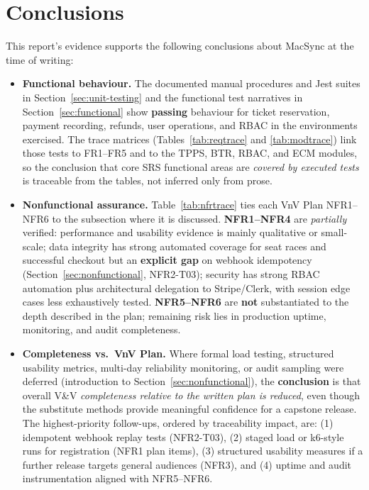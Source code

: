 \documentclass[12pt, titlepage]{article}
\begin{document}
\section{Conclusions}

This report's evidence supports the following conclusions about MacSync at the time of writing:

\begin{itemize}
\item \textbf{Functional behaviour.} The documented manual procedures and Jest suites in Section~\ref{sec:unit-testing} and the functional test narratives in Section~\ref{sec:functional} show \textbf{passing} behaviour for ticket reservation, payment recording, refunds, user operations, and RBAC in the environments exercised. The trace matrices (Tables~\ref{tab:reqtrace} and \ref{tab:modtrace}) link those tests to FR1--FR5 and to the TPPS, BTR, RBAC, and ECM modules, so the conclusion that core SRS functional areas are \emph{covered by executed tests} is traceable from the tables, not inferred only from prose.

\item \textbf{Nonfunctional assurance.} Table~\ref{tab:nfrtrace} ties each VnV Plan NFR1--NFR6 to the subsection where it is discussed. \textbf{NFR1--NFR4} are \emph{partially} verified: performance and usability evidence is mainly qualitative or small-scale; data integrity has strong automated coverage for seat races and successful checkout but an \textbf{explicit gap} on webhook idempotency (Section~\ref{sec:nonfunctional}, NFR2-T03); security has strong RBAC automation plus architectural delegation to Stripe/Clerk, with session edge cases less exhaustively tested. \textbf{NFR5--NFR6} are \textbf{not} substantiated to the depth described in the plan; remaining risk lies in production uptime, monitoring, and audit completeness.

\item \textbf{Completeness vs.\ VnV Plan.} Where formal load testing, structured usability metrics, multi-day reliability monitoring, or audit sampling were deferred (introduction to Section~\ref{sec:nonfunctional}), the \textbf{conclusion} is that overall V\&V \emph{completeness relative to the written plan is reduced}, even though the substitute methods provide meaningful confidence for a capstone release. The highest-priority follow-ups, ordered by traceability impact, are: (1) idempotent webhook replay tests (NFR2-T03), (2) staged load or k6-style runs for registration (NFR1 plan items), (3) structured usability measures if a further release targets general audiences (NFR3), and (4) uptime and audit instrumentation aligned with NFR5--NFR6.
\end{itemize}
\end{document}
